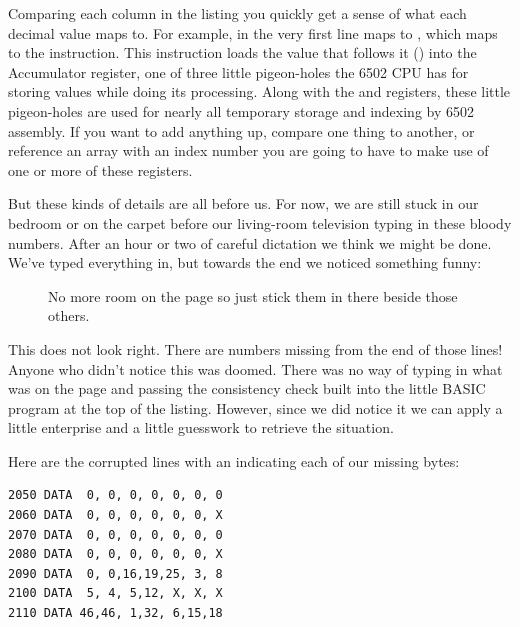 Comparing each column in the listing you quickly get a sense of what each decimal value maps to. For example, in
the very first line
 maps to , which maps to the  instruction. This instruction loads the value
that follows it () into the Accumulator register, one of three little pigeon-holes the 6502 CPU
has for storing values while doing its processing. Along with the  and  registers, these little
pigeon-holes are used for nearly all temporary storage and indexing by 6502 assembly. If you want to add anything up,
compare one thing to another, or reference an array with an index number you are going to have to make use of one
or more of these registers.

But these kinds of details are all before us. For now, we are still stuck in our bedroom or on the carpet before
our living-room television typing in these bloody numbers. After an hour or two of careful dictation we think
we might be done. We've typed everything in, but towards the end we noticed something funny:

\begin{figure}[H]
    \centering
    \begin{adjustbox}{width=7cm,center}
    \end{adjustbox}
  \caption{No more room on the page so just stick them in there beside those others.}
\end{figure}

This does not look right. There are numbers missing from the end of those lines! Anyone who didn't notice
this was doomed. There was no way of typing in what was on the page and passing the consistency check
built into the little BASIC program at the top of the listing. However, since we did notice it we can apply
a little enterprise and a little guesswork to retrieve the situation.

Here are the corrupted lines with an  indicating each of our missing bytes:

\lstset{style=C64BasicStyle}
\begin{lstlisting}[escapechar=\%]
2050 DATA  0, 0, 0, 0, 0, 0, 0 
2060 DATA  0, 0, 0, 0, 0, 0, X
2070 DATA  0, 0, 0, 0, 0, 0, 0 
2080 DATA  0, 0, 0, 0, 0, 0, X
2090 DATA  0, 0,16,19,25, 3, 8 
2100 DATA  5, 4, 5,12, X, X, X
2110 DATA 46,46, 1,32, 6,15,18
\end{lstlisting}

